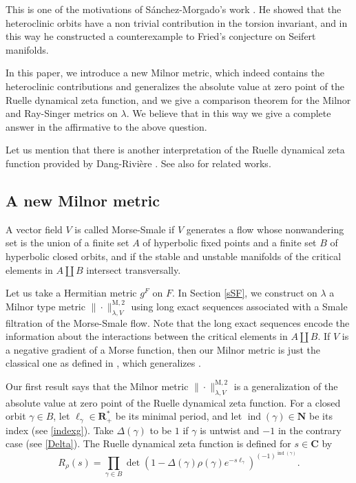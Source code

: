 \documentclass[11pt]{article}
\numberwithin{equation}{section}
\newcommand{\rM}{\mathrm{M}}
\theoremstyle{plain}
\theoremstyle{definition}
\theoremstyle{remark}
\newcommand{\bN}{\mathbf{N}}
\newcommand{\bR}{\mathbf{R}}
\newcommand{\bC}{\mathbf{C}}
\DeclareMathOperator{\ind}{ind}
\begin{document}
This is one of the motivations of Sánchez-Morgado's work
\cite{MorgadoMorseSmale}. He showed that the
heteroclinic orbits have a non trivial contribution in the torsion
invariant, and in this way he constructed a counterexample to Fried's
conjecture on Seifert manifolds.

In this
paper, we introduce a new Milnor metric,
which indeed contains the heteroclinic contributions and
generalizes the absolute value at zero point of the Ruelle dynamical zeta function, and we
give a comparison theorem for the Milnor and Ray-Singer metrics on
$\lambda$. We believe
that in this way we give a complete answer in the affirmative to the above question.

Let us mention that there is another interpretation of the Ruelle dynamical zeta
function provided by Dang-Rivière \cite{DR_MSR}. See also
\cite{DR_MSG, DR_MSI, DR_MSII, DR_MSW} for related works.

\subsection{A new Milnor metric}
A vector field $V$ is called Morse-Smale if $V$ generates a flow
whose nonwandering set is the union of a finite set $A$ of
hyperbolic fixed points and a finite set $B$ of hyperbolic closed orbits, and if the stable and unstable manifolds of the critical
elements in $A\coprod B$ intersect transversally.

Let us take a Hermitian metric $g^{F}$ on $F$. In Section
\ref{sSF}, we construct on $\lambda$ a Milnor type metric
$\|{\cdot}\|^{\rM,2}_{\lambda, V}$ using long exact
sequences associated with a Smale
filtration of the Morse-Smale flow. Note that
the long exact
sequences encode the information about the interactions
between the critical elements in $A\coprod B$. If $V$ is a negative gradient of a Morse function,
then our Milnor metric is just the classical one as defined in
\cite[Def.\,1.9]{BZ92}, which generalizes \cite{MilnorWhiteheadTor}.

Our first result says that the Milnor metric
$\|{\cdot}\|^{\rM,2}_{\lambda, V}$ is a generalization of the absolute value at
zero point of
the Ruelle dynamical zeta function. For a closed orbit $\gamma\in B$,
let $\ell_{\gamma}\in \bR^{*}_{+}$ be its minimal period, and let
$\ind(\gamma)\in \bN$ be its index
(see \eqref{indexg}). Take $\Delta(\gamma)$ to be $1$ if
$\gamma$ is untwist and $-1$ in the contrary case (see \eqref{Delta}). The Ruelle dynamical zeta function
is defined for $s\in \bC$ by
\begin{equation*}\label{intoR}
R_{\rho}(s)=\prod_{\gamma\in
B}\det(1-\Delta(\gamma)\rho(\gamma)e^{-s
\ell_\gamma})^{(-1)^{\ind(\gamma)}}.
\end{equation*}
\end{document}
